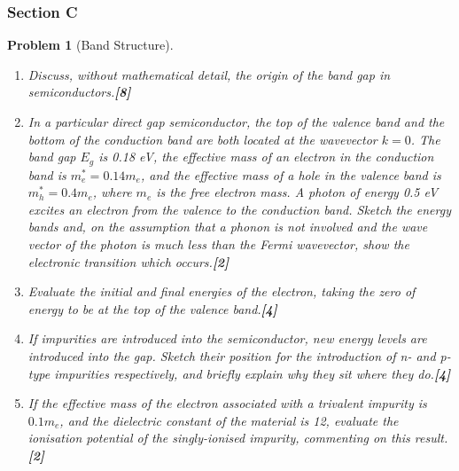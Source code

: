 \documentclass[a4paper]{article}
\theoremstyle{new}
\newtheorem{qns}{Problem}[subsection]
\begin{document}
\subsubsection{Section C}
\begin{qns}[Band Structure]\leavevmode
\begin{enumerate}[label=(\roman*)]
\item Discuss, without mathematical detail, the origin of the band gap in semiconductors.\hfill\textbf{[8]}
\item In a particular direct gap semiconductor, the top of the valence band and the bottom of the conduction band are both located at the wavevector $k = 0$. The band gap $E_g$ is 0.18 eV, the effective mass of an electron in the conduction band is $m_e^*=0.14 m_e$, and the effective mass of a hole in the valence band is $m_h^*=0.4 m_e$, where $m_e$ is the free electron mass. A photon of energy 0.5 eV excites an electron from the valence to the conduction band. Sketch the energy bands and, on the assumption that a phonon is not involved and the wave vector of the photon is much less than the Fermi wavevector, show the electronic transition which occurs.\hfill\textbf{[2]}
\item Evaluate the initial and final energies of the electron, taking the zero of energy to be at the top of the valence band.\hfill\textbf{[4]}
\item If impurities are introduced into the semiconductor, new energy levels are introduced into the gap. Sketch their position for the introduction of n- and p-type impurities respectively, and briefly explain why they sit where they do.\hfill\textbf{[4]}
\item If the effective mass of the electron associated with a trivalent impurity is $0.1 m_e$, and the dielectric constant of the material is 12, evaluate the ionisation potential of the singly-ionised impurity, commenting on this result.\hfill\textbf{[2]}
\end{enumerate}
\begin{mdframed}
\end{mdframed}
\end{qns}
\end{document}
